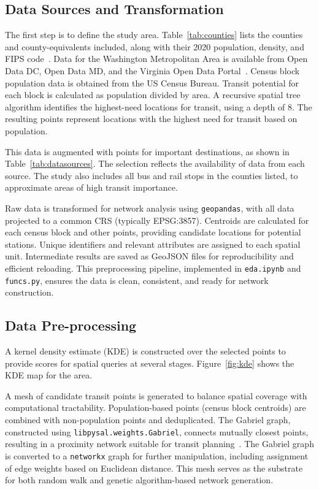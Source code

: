 \documentclass[manuscript]{acmart}
\begin{document}
\subsection{Data Sources and Transformation}
The first step is to define the study area. Table~\ref{tab:counties} lists the counties and county-equivalents included, along with their 2020 population, density, and FIPS code~\cite{lit:census}. Data for the Washington Metropolitan Area is available from Open Data DC, Open Data MD, and the Virginia Open Data Portal~\cite{lit:opendata}. Census block population data is obtained from the US Census Bureau. Transit potential for each block is calculated as population divided by area. A recursive spatial tree algorithm identifies the highest-need locations for transit, using a depth of 8. The resulting points represent locations with the highest need for transit based on population.

This data is augmented with points for important destinations, as shown in Table~\ref{tab:datasources}. The selection reflects the availability of data from each source. The study also includes all bus and rail stops in the counties listed, to approximate areas of high transit importance.

Raw data is transformed for network analysis using \texttt{geopandas}, with all data projected to a common CRS (typically EPSG:3857). Centroids are calculated for each census block and other points, providing candidate locations for potential stations. Unique identifiers and relevant attributes are assigned to each spatial unit. Intermediate results are saved as GeoJSON files for reproducibility and efficient reloading. This preprocessing pipeline, implemented in \texttt{eda.ipynb} and \texttt{funcs.py}, ensures the data is clean, consistent, and ready for network construction.

\subsection{Data Pre-processing}

A kernel density estimate (KDE) is constructed over the selected points to provide scores for spatial queries at several stages. Figure~\ref{fig:kde} shows the KDE map for the area.

A mesh of candidate transit points is generated to balance spatial coverage with computational tractability. Population-based points (census block centroids) are combined with non-population points and deduplicated. The Gabriel graph, constructed using \texttt{libpysal.weights.Gabriel}, connects mutually closest points, resulting in a proximity network suitable for transit planning~\cite{bib:samet1984quadtrees, bib:libera1986btrees}. The Gabriel graph is converted to a \texttt{networkx} graph for further manipulation, including assignment of edge weights based on Euclidean distance. This mesh serves as the substrate for both random walk and genetic algorithm-based network generation.
\end{document}
